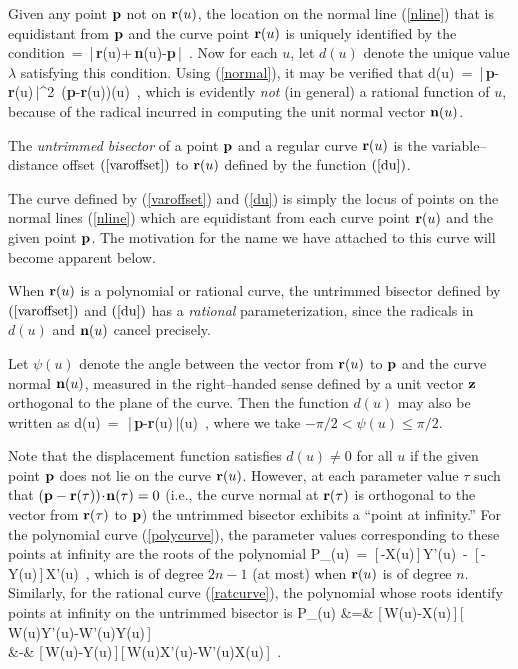 Given any point ${\bf p}$ not on ${\bf r}(u)$, the location on the
normal line (\ref{nline}) that is equidistant from ${\bf p}$ and the
curve point ${\bf r}(u)$ is uniquely identified by the condition
\be
\lambda \,=\, |\,{\bf r}(u)+\lambda\,{\bf n}(u)-{\bf p}\,| \,.
\ee
Now for each $u$, let $d(u)$ denote the unique value $\lambda$
satisfying this condition. Using (\ref{normal}), it may be verified
that
\be \label{du}
d(u) \,=\, {|\,{\bf p}-{\bf r}(u)\,|^2 \,({\bf p}-{\bf r}(u))(u)} \,,
\ee
which is evidently {\it not\/} (in general) a rational function of
$u$, because of the radical incurred in computing the unit normal
vector ${\bf n}(u)$.

\begin{dfn}
The {\it untrimmed bisector\/} of a point ${\bf p}$ and a regular
curve ${\bf r}(u)$ is the variable--distance offset $(\ref{varoffset})$
to ${\bf r}(u)$ defined by the function $(\ref{du})$.
\end{dfn}

The curve defined by (\ref{varoffset}) and (\ref{du}) is simply
the locus of points on the normal lines (\ref{nline}) which are
equidistant from each curve point ${\bf r}(u)$ and the given point
${\bf p}$. The motivation for the name we have attached to this
curve will become apparent below.

\begin{rmk}
{\rm
When ${\bf r}(u)$ is a polynomial or rational curve, the untrimmed
bisector defined by $(\ref{varoffset})$ and $(\ref{du})$ has a
{\it rational\/} parameterization, since the radicals in $d(u)$
and ${\bf n}(u)$ cancel precisely.
}
\end{rmk}

Let $\psi(u)$ denote the angle between the vector from ${\bf r}(u)$
to ${\bf p}$ and the curve normal ${\bf n}(u)$, measured in the
right--handed sense defined by a unit vector ${\bf z}$ orthogonal
to the plane of the curve. Then the function $d(u)$ may also be
written as
\be
d(u) \,=\, \half\,|\,{\bf p}-{\bf r}(u)\,|\sec\psi(u) \,,
\ee
where we take $-\pi/2<\psi(u)\le\pi/2$.

Note that the displacement function satisfies $d(u)\not=0$ for
all $u$ if the given point ${\bf p}$ does not lie on the curve
${\bf r}(u)$. However, at each parameter value $\tau$ such that
$({\bf p}-{\bf r}(\tau))\!\cdot\!{\bf n}(\tau)=0$ (i.e., the curve
normal at ${\bf r}(\tau)$ is orthogonal to the vector from
${\bf r}(\tau)$ to ${\bf p}$) the untrimmed bisector exhibits a
``point at infinity.'' For the polynomial curve (\ref{polycurve}),
the parameter values corresponding to these points at infinity
are the roots of the polynomial
\be \label{Pinf}
P_\infty(u) \,=\,
[\,\alpha-X(u)\,]\,Y'(u) \,-\, [\,\beta-Y(u)\,]\,X'(u) \,,
\ee
which is of degree $2n-1$ (at most) when ${\bf r}(u)$ is of
degree $n$. Similarly, for the rational curve (\ref{ratcurve}),
the polynomial whose roots identify points at infinity on the
untrimmed bisector is
\ba \label{Rinf}
P_\infty(u)
&=& [\,\alpha W(u)-X(u)\,]\,[\,W(u)Y'(u)-W'(u)Y(u)\,] \nonumber \\
&-& [\,\beta  W(u)-Y(u)\,]\,[\,W(u)X'(u)-W'(u)X(u)\,] \,.
\ea

